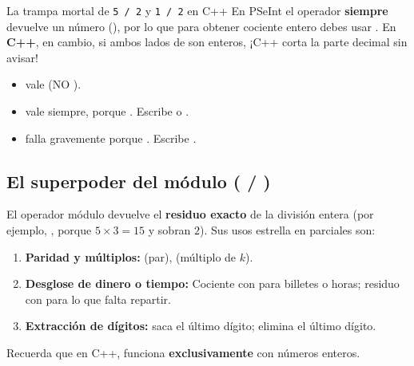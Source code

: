 \documentclass[11pt,letterpaper]{article}
\begin{document}
\begin{peligro}{La trampa mortal de \texttt{5 / 2} y \texttt{1 / 2} en C++}
En PSeInt el operador \codigo{/} \textbf{siempre} devuelve un número  (), por lo que para obtener cociente entero debes usar .
En \textbf{C++}, en cambio, si ambos lados de \codigo{/} son enteros, ¡C++ corta la parte decimal sin avisar!
\begin{itemize}
  \item {} vale \textbf{} (NO ).
  \item {} vale \textbf{} siempre, porque . Escribe  o .
  \item {} falla gravemente porque . Escribe .
\end{itemize}
\end{peligro}

\subsection{El superpoder del módulo (\texorpdfstring{\codigo{\%} / }{\% / MOD})}
El operador módulo devuelve el \textbf{residuo exacto} de la división entera (por ejemplo, , porque $5 \times 3 = 15$ y sobran $2$). Sus usos estrella en parciales son:
\begin{enumerate}
  \item \textbf{Paridad y múltiplos:}  (par),  (múltiplo de $k$).
  \item \textbf{Desglose de dinero o tiempo:} Cociente con \codigo{/} para billetes o horas; residuo con \codigo{\%} para lo que falta repartir.
  \item \textbf{Extracción de dígitos:}  saca el último dígito;  elimina el último dígito.
\end{enumerate}
Recuerda que en C++, \codigo{\%} funciona \textbf{exclusivamente} con números enteros.
\end{document}
